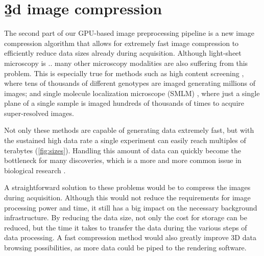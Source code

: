 





  
\section{\b3d image compression}

  The second part of our GPU-based image preprocessing pipeline is a new image compression algorithm that allows for extremely fast image compression to efficiently reduce data sizes already during acquisition. Although light-sheet microscopy is .. many other microscopy modalities are also suffering from this problem. This is especially true for methods such as high content screening \cite{carpenter_systematic_2004,echeverri_high-throughput_2006,pepperkok_high-throughput_2006}, where tens of thousands of different genotypes are imaged generating millions of images; and single molecule localization microscope (SMLM) \cite{betzig_imaging_2006,hess_ultra-high_2006,rust_sub-diffraction-limit_2006}, where just a single plane of a single sample is imaged hundreds of thousands of times to acquire super-resolved images.

  Not only these methods are capable of generating data extremely fast, but with the sustained high data rate a single experiment can easily reach multiples of terabytes (\autoref{fig:sizes}). Handling this amount of data can quickly become the bottleneck for many discoveries, which is a more and more common issue in biological research \cite{wollman_high_2007,reynaud_guide_2015,perkel_struggle_2016}. 

  A straightforward solution to these problems would be to compress the images during acquisition. Although this would not reduce the requirements for image processing power and time, it still has a big impact on the necessary background infrastructure. By reducing the data size, not only the cost for storage can be reduced, but the time it takes to transfer the data during the various steps of data processing. A fast compression method would also greatly improve 3D data browsing possibilities, as more data could be piped to the rendering software.

